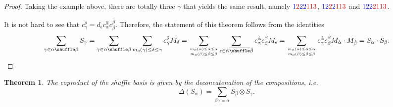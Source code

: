 \documentclass[12pt]{amsart}
\newtheorem{theorem}{Theorem}[section]
\numberwithin{equation}{section}
\begin{document}
\begin{proof}
	Taking the example above, there are totally three $\gamma$ that yields the same result, namely ${\color{blue}1}{\color{red}2}{\color{blue}22}{\color{red}113}$, ${\color{blue}12}{\color{red}2}{\color{blue}2}{\color{red}113}$ and ${\color{blue}122}{\color{red}2113}$.
	
	It is not hard to see that $c_\gamma^\delta=d_\epsilon c_\alpha^{\hat{\alpha}}c_\beta^{\hat{\beta}}$. Therefore, the statement of this theorem follows from the identities
	\begin{align*}
		\sum_{\gamma\in\alpha\shuffle\beta}S_\gamma=\sum_{\gamma\in\alpha\shuffle\beta}\sum_{m_o(\gamma)\leq\delta\leq\gamma}c_{\gamma}^{\delta}M_\delta=\sum_{m_o(\alpha)\leq\hat{\alpha}\leq\alpha \atop m_o(\beta)\leq\hat{\beta}\leq\beta}\sum_{\epsilon\in\hat{\alpha}\overline{\shuffle}\hat{\beta}}c_{\alpha}^{\hat{\alpha}}c_{\beta}^{\hat{\beta}}M_\epsilon=\sum_{m_o(\alpha)\leq\hat{\alpha}\leq\alpha \atop m_o(\beta)\leq\hat{\beta}\leq\beta}c_{\alpha}^{\hat{\alpha}}c_{\beta}^{\hat{\beta}}M_{\hat{\alpha}}\cdot M_{\hat{\beta}}=S_\alpha\cdot S_\beta.
	\end{align*}
\end{proof}

\begin{theorem}\label{thm:shuffle-coproduct}
	The coproduct of the shuffle basis is given by the deconcatenation of the compositions, i.e.
	$$\Delta(S_\alpha)=\sum_{\beta\gamma=\alpha}S_\beta\otimes S_\gamma.$$
\end{theorem}
\end{document}
